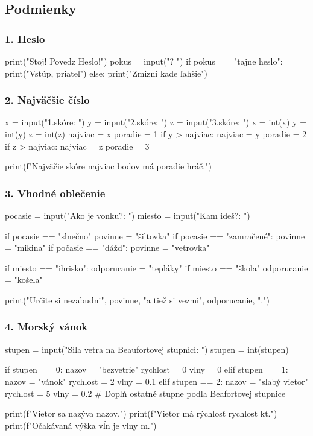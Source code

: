 \subsection{Podmienky}

\subsubsection*{1. Heslo}
\begin{solution}
print("Stoj! Povedz Heslo!")
pokus = input("? ")
if pokus == "tajne heslo":
    print("Vstúp, priateľ")
else:
    print("Zmizni kade ľahšie")
\end{solution}

\subsubsection*{2. Najväčšie číslo}
\begin{solution}
x = input("1.skóre: ")
y = input("2.skóre: ")
z = input("3.skóre: ")
x = int(x)
y = int(y)
z = int(z)
najviac = x
poradie = 1
if y > najviac:
    najviac = y
    poradie = 2
if z > najviac:
    najviac = z
    poradie = 3

print(f"Najväčie skóre {najviac} bodov má {poradie} hráč.")
\end{solution}

\subsubsection*{3. Vhodné oblečenie}

\begin{solution}
pocasie = input("Ako je vonku?: ")
miesto = input("Kam ideš?: ")

if pocasie == "slnečno"
	povinne = "šiltovka"
if pocasie == "zamračené":
	povinne = "mikina"
if počasie == "dážď":
	povinne = "vetrovka"
	
if miesto == "ihrisko":
	odporucanie = "tepláky"
if miesto == "škola"
	odporucanie = "košela"

print("Určite si nezabudni", povinne, "a tiež si vezmi", odporucanie, ".")
\end{solution}

\subsubsection*{4. Morský vánok}
\begin{solution}
stupen = input("Sila vetra na Beaufortovej stupnici: ")
stupen = int(stupen)

if stupen == 0:
	nazov = "bezvetrie"
	rychlost = 0
	vlny = 0
elif stupen == 1:
	nazov = "vánok"
	rychlost = 2
	vlny = 0.1
elif stupen == 2:
	nazov = "slabý vietor"
	rychlost = 5
	vlny = 0.2
# Doplň ostatné stupne podľa Beafortovej stupnice

print(f"Vietor sa nazýva {nazov}.")
print(f"Vietor má rýchlosť {rychlost} kt.")
print(f"Očakávaná výška vĺn je {vlny} m.")
\end{solution}

